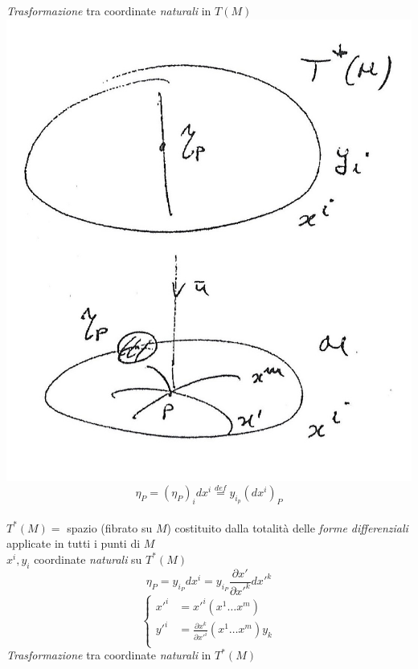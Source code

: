 \begin{multicols}{2}
\textit{Trasformazione} tra coordinate \textit{naturali} in $T (M)$ \\

\includegraphics[width=\columnwidth]{media/struttura-simplettica-del-fibrato-cotangente/20-2}
\smallskip
\begin{equation*}
\eta_P = (\eta_P)_i dx^i \overset{def}{=} y_{i_p}(dx^i)_P 
\end{equation*}
\\
$T^*(M) =$ spazio (fibrato su $M$) costituito dalla totalità delle \textit{forme differenziali} applicate in tutti i punti di $M$ \\
$x^i, y_i$ \quad coordinate \textit{naturali} su $T^*(M)$ \\
\begin{equation*}
\eta_P = y_{i_P} dx^i = y_{i_P} \frac{\partial x'}{\partial x'^k} dx'^k 
\end{equation*}
\begin{equation*}
\left\{
\begin{aligned}
x'^i &= x'^i(x^1 \dots x^m) \\
y'^i &= \frac{\partial x^k}{\partial x'^i} (x^1 \dots x^m) y_k \\ 
\end{aligned}
\right.
\end{equation*}
\textit{Trasformazione} tra coordinate \textit{naturali} in $T^* (M)$ \\
\end{multicols}

